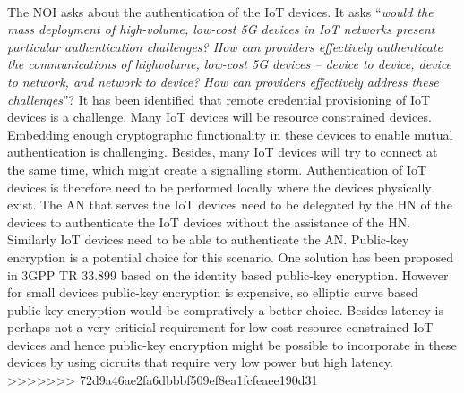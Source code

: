 \documentclass[12pt]{llncs}
\newcommand\ques[1]{``\emph{#1}''}
\begin{document}
\paragraph{}
The NOI asks about the authentication of the IoT devices. It asks \ques{would the mass deployment of high-volume, low-cost 5G devices in IoT networks present particular authentication challenges? How can providers effectively authenticate the communications of highvolume, low-cost 5G devices – device to device, device to network, and network to device? How can providers effectively address these challenges}?
It has been identified that remote credential provisioning of IoT devices is a challenge. Many IoT devices will be resource constrained devices. Embedding enough cryptographic functionality in these devices to enable mutual authentication is challenging. Besides, many IoT devices will try to connect at the same time, which might create a signalling storm. Authentication of IoT devices is therefore need to be performed locally where the devices physically exist. The AN that serves the IoT devices need to be delegated by the HN of the devices to authenticate the IoT devices without the assistance of the HN. Similarly IoT devices need to be able to authenticate the AN. Public-key encryption is a potential choice for this scenario. One solution has been proposed in 3GPP TR 33.899 based on the identity based public-key encryption. However for small devices public-key encryption is expensive, so elliptic curve based public-key encryption would be compratively a better choice. Besides latency is perhaps not a very criticial requirement for low cost resource constrained IoT devices and hence public-key encryption might be possible to incorporate in these devices by using cicruits that require very low power but high latency.
>>>>>>> 72d9a46ae2fa6dbbbf509ef8ea1fcfeaee190d31
\end{document}

